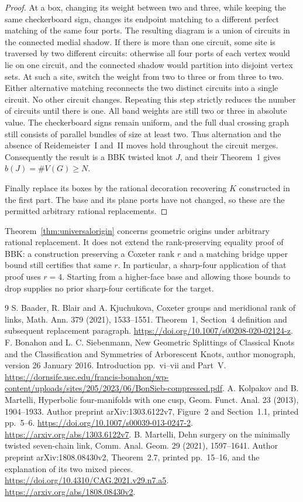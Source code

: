 \documentclass[11pt]{article}
\begin{document}
\begin{proof}
At a box, changing its weight between two and three, while keeping
the same checkerboard sign, changes its endpoint matching to a
different perfect matching of the same four ports. The resulting diagram is a union
of circuits in the connected medial shadow. If there is more than
one circuit, some site is traversed by two different circuits:
otherwise all four ports of each vertex would lie on one circuit,
and the connected shadow would partition into disjoint vertex sets.
At such a site, switch the weight from two to three or from three
to two. Either alternative matching reconnects the two distinct
circuits into a single circuit. No other circuit changes. Repeating
this step strictly reduces the number of circuits until there is
one. All band weights are still two or three in absolute value.
The checkerboard signs remain uniform, and the full dual crossing
graph still consists of parallel bundles of size at least two.
Thus alternation and the absence of Reidemeister~I and~II moves
hold throughout the circuit merges.
Consequently the result is a BBK twisted knot $J$, and their
Theorem~1 gives $b(J)=\#V(G)\ge N$.

Finally replace its boxes by the rational decoration recovering $K$
constructed in the first part. The base and its plane ports have not
changed, so these are the permitted arbitrary rational replacements.
\end{proof}

Theorem~\ref{thm:universalorigin} concerns geometric origins under
arbitrary rational replacement. It does not extend the rank-preserving
equality proof of BBK: a construction preserving a Coxeter
rank $r$ and a matching bridge upper bound still certifies that same
$r$. In particular, a sharp-four application of that proof uses
$r=4$. Starting from a higher-face base and allowing those bounds
to drop supplies no prior sharp-four certificate for the target.

\begin{thebibliography}{9}
S. Baader, R. Blair and A. Kjuchukova,
Coxeter groups and meridional rank of links,
Math. Ann. 379 (2021), 1533--1551.
Theorem~1, Section~4 definition and subsequent replacement paragraph.
\url{https://doi.org/10.1007/s00208-020-02124-z}.
F. Bonahon and L. C. Siebenmann,
New Geometric Splittings of Classical Knots and the Classification
and Symmetries of Arborescent Knots, author monograph,
version 26 January 2016. Introduction pp.~vi--vii and Part~V.
\url{https://dornsife.usc.edu/francis-bonahon/wp-content/uploads/sites/205/2023/06/BonSieb-compressed.pdf}.
A. Kolpakov and B. Martelli,
Hyperbolic four-manifolds with one cusp,
Geom. Funct. Anal. 23 (2013), 1904--1933.
Author preprint arXiv:1303.6122v7,
Figure~2 and Section~1.1, printed pp.~5--6.
\url{https://doi.org/10.1007/s00039-013-0247-2}.
\url{https://arxiv.org/abs/1303.6122v7}.
B. Martelli, Dehn surgery on the minimally twisted seven-chain link,
Comm. Anal. Geom. 29 (2021), 1597--1641.
Author preprint arXiv:1808.08430v2, Theorem~2.7, printed pp.~15--16,
and the explanation of its two mixed pieces.
\url{https://doi.org/10.4310/CAG.2021.v29.n7.a5}.
\url{https://arxiv.org/abs/1808.08430v2}.
\end{thebibliography}
\end{document}
